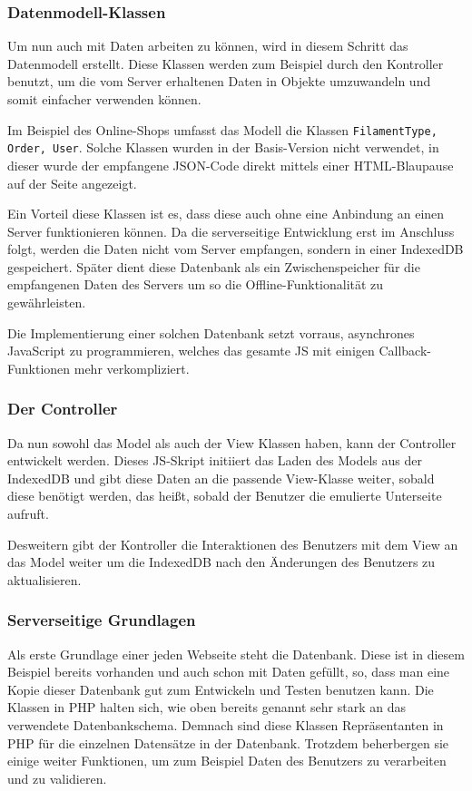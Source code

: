 \documentclass[a4paper,12pt,ngerman,listof=numbered]{scrartcl}      %
\providecommand{\inlinecode}[1]{\texttt{#1}}
\begin{document}
	\subsubsection{Datenmodell-Klassen}
	Um nun auch mit Daten arbeiten zu können, wird in diesem Schritt das Datenmodell erstellt. Diese Klassen werden zum Beispiel durch den Kontroller benutzt, um die vom Server erhaltenen Daten in Objekte umzuwandeln und somit einfacher verwenden können.\par
	Im Beispiel des Online-Shops umfasst das Modell die Klassen \inlinecode{FilamentType, Order, User}. Solche Klassen wurden in der Basis-Version nicht verwendet, in dieser wurde der empfangene JSON-Code direkt mittels einer HTML-Blaupause auf der Seite angezeigt.\par
	Ein Vorteil diese Klassen ist es, dass diese auch ohne eine Anbindung an einen Server funktionieren können. Da die serverseitige Entwicklung erst im Anschluss folgt, werden die Daten nicht vom Server empfangen, sondern in einer IndexedDB gespeichert. Später dient diese Datenbank als ein Zwischenspeicher für die empfangenen Daten des Servers um so die Offline-Funktionalität zu gewährleisten.\par
	Die Implementierung einer solchen Datenbank setzt vorraus, asynchrones Java\-Script zu programmieren, welches das gesamte JS mit einigen Call\-back-Funk\-ti\-onen mehr verkompliziert.\par
	
	\subsubsection{Der Controller}
	Da nun sowohl das Model als auch der View Klassen haben, kann der Controller entwickelt werden. Dieses JS-Skript initiiert das Laden des Models aus der IndexedDB und gibt diese Daten an die passende View-Klasse weiter, sobald diese benötigt werden, das heißt, sobald der Benutzer die emulierte Unterseite aufruft.\par
	Desweitern gibt der Kontroller die Interaktionen des Benutzers mit dem View an das Model weiter um die IndexedDB nach den Änderungen des Benutzers zu aktualisieren.\par
	
	\subsubsection{Serverseitige Grundlagen}
	Als erste Grundlage einer jeden Webseite steht die Datenbank. Diese ist in diesem Beispiel bereits vorhanden und auch schon mit Daten gefüllt, so, dass man eine Kopie dieser Datenbank gut zum Entwickeln und Testen benutzen kann. Die Klassen in PHP halten sich, wie oben bereits genannt sehr stark an das verwendete Datenbankschema. Demnach sind diese Klassen Repräsentanten in PHP für die einzelnen Datensätze in der Datenbank. Trotzdem beherbergen sie einige weiter Funktionen, um zum Beispiel Daten des Benutzers zu verarbeiten und zu validieren.\par
	
\end{document}
